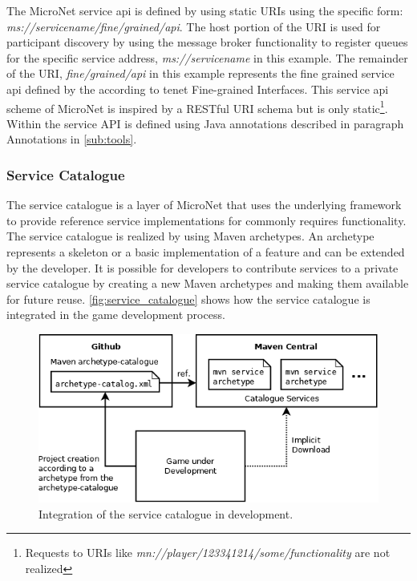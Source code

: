 The MicroNet service \gls{api} is defined by using static URIs using the specific
form: \textit{ms://servicename/fine/grained/api}. The host portion of the URI is
used for participant discovery by using the message broker functionality to
register queues for the specific service address, \textit{ms://servicename} in
this example. The remainder of the URI, \textit{fine/grained/api} in this
example represents the fine grained service \gls{api} defined by the \ms{} according
to tenet Fine-grained Interfaces. This service \gls{api} scheme of MicroNet is
inspired by a RESTful URI schema but is only static\footnote{Requests to URIs
like \textit{mn://player/123341214/some/functionality} are not realized}. Within
\mss{} the service API is defined using Java annotations described in paragraph
Annotations in \autoref{sub:tools}.

\subsubsection{Service Catalogue}

The service catalogue is a layer of MicroNet that uses the underlying framework
to provide reference service implementations for commonly requires
functionality. The service catalogue is realized by using Maven archetypes. An
archetype represents a skeleton or a basic implementation of a feature and can
be extended by the developer. It is possible for developers to contribute
services to a private service catalogue by creating a new Maven archetypes and
making them available for future reuse. \autoref{fig:service_catalogue} shows
how the service catalogue is integrated in the game development process.

\begin{figure}
	\centering
	\includegraphics[width=12cm]{images/architecture/ServiceCatalogue}
	\caption{Integration of the service catalogue in \og{} development.}
	\label{fig:service_catalogue}
\end{figure}

